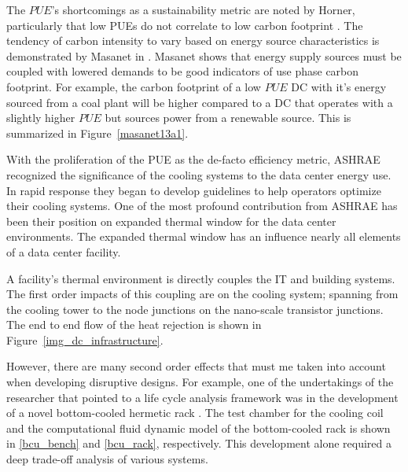     The $PUE$'s shortcomings as a sustainability metric are noted by Horner, particularly that low PUEs do not correlate to low carbon footprint \cite{Horner16a}. The tendency of carbon intensity to vary based on energy source characteristics is demonstrated by Masanet in \cite{Masanet13a}. Masanet shows that energy supply sources must be coupled with lowered demands to be good indicators of use phase carbon footprint. For example, the carbon footprint of a low $PUE$ DC with it's energy sourced from a coal plant will be higher compared to a DC that operates with a slightly higher $PUE$ but sources power from a renewable source. This is summarized in Figure~\ref{masanet13a1}.
    
    
    
    With the proliferation of the PUE as the de-facto efficiency metric, ASHRAE recognized the significance of the cooling systems to the data center energy use. In rapid response they began to develop guidelines to help operators optimize their cooling systems. One of the most profound contribution from ASHRAE has been their position on expanded thermal window for the data center environments. The expanded thermal window has an influence nearly all elements of a data center facility. 
    
    
    
    A facility's thermal environment is directly couples the IT and building systems. The first order impacts of this coupling are on the cooling system; spanning from the cooling tower to the node junctions on the nano-scale transistor junctions. The end to end flow of the heat rejection is shown in Figure~\ref{img_dc_infrastructure}. 
    
    
    
    However, there are many second order effects that must me taken into account when developing disruptive designs. For example, one of the undertakings of the researcher that pointed to a life cycle analysis framework was in the development of a novel bottom-cooled hermetic rack \cite{gao16}. The test chamber for the cooling coil and the computational fluid dynamic model of the bottom-cooled rack is shown in \ref{bcu_bench} and \ref{bcu_rack}, respectively. This development alone required a deep trade-off analysis of various systems. 
    
    
    
